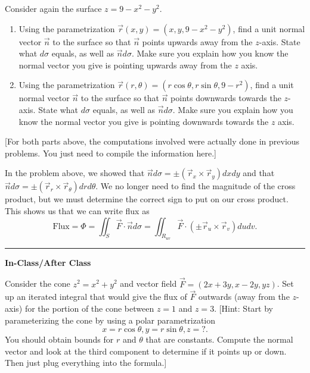 \begin{problem}
Consider again the surface $z=9-x^2-y^2$. 
\begin{enumerate}
 \item Using the parametrization $\vec r(x,y) =(x,y,9-x^2-y^2)$, find a unit normal vector $\vec n$ to the surface so that $\vec n$ points upwards away from the $z$-axis. State what $d\sigma$ equals, as well as $\vec n d\sigma$. 
Make sure you explain how you know the normal vector you give is pointing upwards away from the $z$ axis.
 \item Using the parametrization $\vec r(r,\theta) =(r\cos \theta,r\sin\theta ,9-r^2)$, find a unit normal vector $\vec n$ to the surface so that $\vec n$ points downwards towards the $z$-axis. State what $d\sigma$ equals, as well as $\vec n d\sigma$.  
Make sure you explain how you know the normal vector you give is pointing downwards towards the $z$ axis.
\end{enumerate}
[For both parts above, the computations involved were actually done in previous problems. You just need to compile the information here.]
\end{problem}


In the problem above, we showed that $\vec n d\sigma = \pm(\vec r_x\times\vec r_y)dxdy$ and that $\vec n d\sigma = \pm(\vec r_r\times\vec r_\theta)drd\theta$.  We no longer need to find the magnitude of the cross product, but we must determine the correct sign to put on our cross product.  This shows us that we can write flux as 
$$\text{Flux}=\Phi 
= \iint_S \vec F\cdot \vec n d\sigma 
= \iint_{R_{uv}} \vec F\cdot (\pm \vec r_u\times \vec r_v) dudv
.$$

\hrule

\newpage
\Large
\textbf{In-Class/After Class}
\normalsize


\begin{problem}
 Consider the cone $z^2=x^2+y^2$ and vector field $\vec F = (2x+3y, x-2y, yz)$. Set up an iterated integral that would give the flux of $\vec F$ outwards (away from the $z$-axis) for the portion of the cone between $z=1$ and $z=3$. [Hint: Start by  parameterizing the cone by using a polar parametrization $$x=r\cos\theta, y=r\sin\theta, z=?.$$ You should obtain bounds for $r$ and $\theta$ that are constants.  Compute the normal vector and look at the third component to determine if it points up or down.  Then just plug everything into the formula.]
\end{problem}




